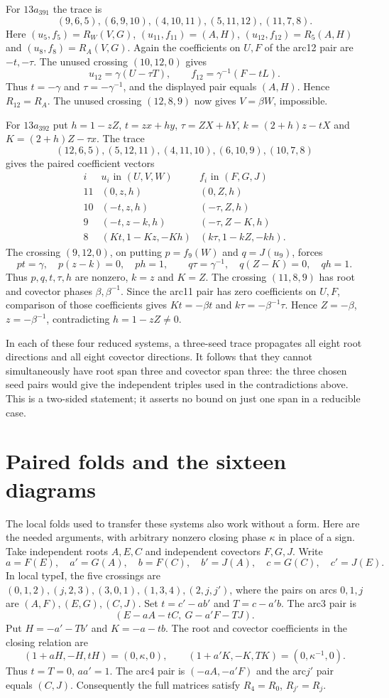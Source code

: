 \documentclass[11pt]{article}
\begin{document}
For $13a_{391}$ the trace is
\[
 (9,6,5),(6,9,10),(4,10,11),(5,11,12),(11,7,8).
\]
Here $(u_5,f_5)=R_W(V,G)$, $(u_{11},f_{11})=(A,H)$,
$(u_{12},f_{12})=R_5(A,H)$ and $(u_8,f_8)=R_A(V,G)$.
Again the coefficients on $U,F$ of the arc12 pair are $-t,-\tau$.
The unused crossing $(10,12,0)$ gives
\[
 u_{12}=\gamma(U-\tau T),\qquad
 f_{12}=\gamma^{-1}(F-tL).
\]
Thus $t=-\gamma$ and $\tau=-\gamma^{-1}$, and the displayed
pair equals $(A,H)$. Hence $R_{12}=R_A$.
The unused crossing $(12,8,9)$ now gives $V=\beta W$, impossible.

For $13a_{392}$ put $h=1-zZ$,
$t=zx+hy$, $\tau=ZX+hY$,
$k=(2+h)z-tX$ and $K=(2+h)Z-\tau x$.
The trace
\[
 (12,6,5),(5,12,11),(4,11,10),(6,10,9),(10,7,8)
\]
gives the paired coefficient vectors
\[
\begin{array}{c|c|c}
i&u_i\text{ in }(U,V,W)&f_i\text{ in }(F,G,J)\\\hline
11&(0,z,h)&(0,Z,h)\\
10&(-t,z,h)&(-\tau,Z,h)\\
9&(-t,z-k,h)&(-\tau,Z-K,h)\\
8&(Kt,1-Kz,-Kh)&(k\tau,1-kZ,-kh).
\end{array}
\]
The crossing $(9,12,0)$, on putting $p=f_9(W)$ and $q=J(u_9)$,
forces
\[
 pt=\gamma,\quad p(z-k)=0,\quad ph=1,\qquad
 q\tau=\gamma^{-1},\quad q(Z-K)=0,\quad qh=1.
\]
Thus $p,q,t,\tau,h$ are nonzero, $k=z$ and $K=Z$.
The crossing $(11,8,9)$ has root and covector phases $\beta,\beta^{-1}$.
Since the arc11 pair has zero coefficients on $U,F$, comparison of
those coefficients gives $Kt=-\beta t$ and
$k\tau=-\beta^{-1}\tau$. Hence $Z=-\beta$, $z=-\beta^{-1}$,
contradicting $h=1-zZ\ne0$.

In each of these four reduced systems, a three-seed trace propagates
all eight root directions and all eight covector directions. It follows
that they cannot simultaneously have root span three and covector
span three: the three chosen seed pairs would give the independent
triples used in the contradictions above. This is a two-sided
statement; it asserts no bound on just one span in a reducible case.

\section{Paired folds and the sixteen diagrams}

The local folds used to transfer these systems also work without a
form. Here are the needed arguments, with arbitrary nonzero closing
phase $\kappa$ in place of a sign. Take independent roots $A,E,C$
and independent covectors $F,G,J$. Write
\[
 a=F(E),\quad a'=G(A),\quad b=F(C),\quad b'=J(A),\quad
 c=G(C),\quad c'=J(E).
\]
In local typeI, the five crossings are
$(0,1,2),(j,2,3),(3,0,1),(1,3,4),(2,j,j')$,
where the pairs on arcs $0,1,j$ are $(A,F),(E,G),(C,J)$.
Set $t=c'-ab'$ and $T=c-a'b$. The arc3 pair is
\[
       (E-aA-tC,\ G-a'F-TJ).
\]
Put $H=-a'-Tb'$ and $K=-a-tb$.
The root and covector coefficients in the closing relation are
\[
 (1+aH,-H,tH)=(0,\kappa,0),\qquad
 (1+a'K,-K,TK)=(0,\kappa^{-1},0).
\]
Thus $t=T=0$, $aa'=1$. The arc4 pair is
$(-aA,-a'F)$ and the arc$j'$ pair equals $(C,J)$.
Consequently the full matrices satisfy $R_4=R_0$, $R_{j'}=R_j$.
\end{document}
